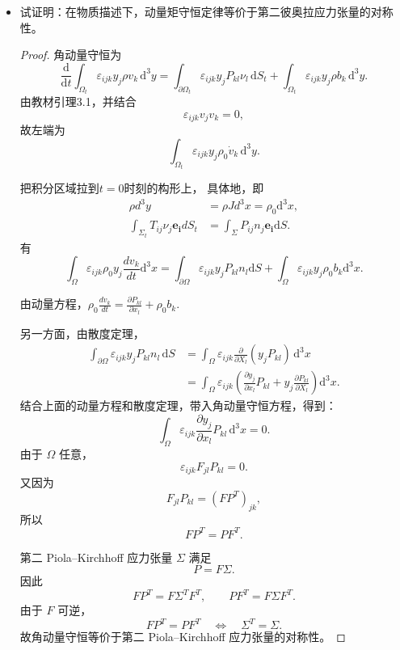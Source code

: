 \begin{itemize}
\begin{proof}
    

    \end{proof}

    \item[3.]试证明：在物质描述下，动量矩守恒定律等价于第二彼奥拉应力张量的对称性。

    \begin{proof}


角动量守恒为
\[
\frac{\mathrm d}{\mathrm dt}
\int_{\Omega_t}
\varepsilon_{ijk}y_j\rho v_k\,\mathrm d^3y
=
\int_{\partial\Omega_t}
\varepsilon_{ijk}y_jP_{kl}\nu_l\,\mathrm dS_t
+
\int_{\Omega_t}
\varepsilon_{ijk}y_j\rho b_k\,\mathrm d^3y.
\]
由教材引理3.1，并结合
\[
\varepsilon_{ijk}v_jv_k=0,
\]
故左端为
\[
\int_{\Omega_t}
\varepsilon_{ijk}y_j\rho_0\dot v_k\,\mathrm d^3y.
\]

把积分区域拉到$t=0$时刻的构形上，
具体地，即
\begin{equation*}
    \begin{aligned}
        \rho d^3y&=\rho Jd^3x=\rho_0 \mathrm d^3x,\\
        \int_{\Sigma_t} T_{ij}\nu_j\boldsymbol{e_i}dS_t&=\int_{\Sigma}P_{ij}n_j\boldsymbol{e_i}\mathrm dS.
    \end{aligned}
\end{equation*}
有
\[\int_{\Omega}\varepsilon_{ijk}\rho_0y_j\frac{dv_k}{dt}
\mathrm d^3x=\int_{\partial\Omega}\varepsilon_{ijk}
y_jP_{kl}n_l\mathrm dS+\int_{\Omega}\varepsilon_{ijk}y_j\rho_0
b_k\mathrm d^3x.\]

由动量方程，\(\rho_0\frac{dv_k}{dt}=\frac{\partial P_{kl}}{\partial x_l}+\rho_0b_k.\)

另一方面，由散度定理，
\[
\begin{aligned}
\int_{\partial\Omega}
\varepsilon_{ijk}y_jP_{kl}n_l\,\mathrm dS
&=
\int_\Omega
\varepsilon_{ijk}
\frac{\partial}{\partial X_l}(y_jP_{kl})\,\mathrm d^3x\\
&=
\int_\Omega
\varepsilon_{ijk}
\left(
\frac{\partial y_j}{\partial x_l}P_{kl}
+y_j\frac{\partial P_{kl}}{\partial X_l}
\right)\mathrm d^3x.
\end{aligned}
\]
结合上面的动量方程和散度定理，带入角动量守恒方程，得到：
\[
\int_\Omega
\varepsilon_{ijk}\frac{\partial y_j}{\partial x_l}P_{kl}\,\mathrm d^3x=0.
\]
由于 \(\Omega\) 任意，
\[
\varepsilon_{ijk}F_{jl}P_{kl}=0.
\]
又因为
\[
F_{jl}P_{kl}=(FP^{T})_{jk},
\]
所以
\[
FP^{T}=PF^{T}.
\]

第二 Piola--Kirchhoff 应力张量 \(\Sigma\) 满足
\[
P=F\Sigma.
\]
因此
\[
FP^{T}=F\Sigma^{T}F^{T},
\qquad
PF^{T}=F\Sigma F^{T}.
\]
由于 \(F\) 可逆，
\[
FP^{T}=PF^{T}
\quad\Longleftrightarrow\quad
\Sigma^{T}=\Sigma.
\]
故角动量守恒等价于第二 Piola--Kirchhoff 应力张量的对称性。
\end{proof}



\end{itemize}

